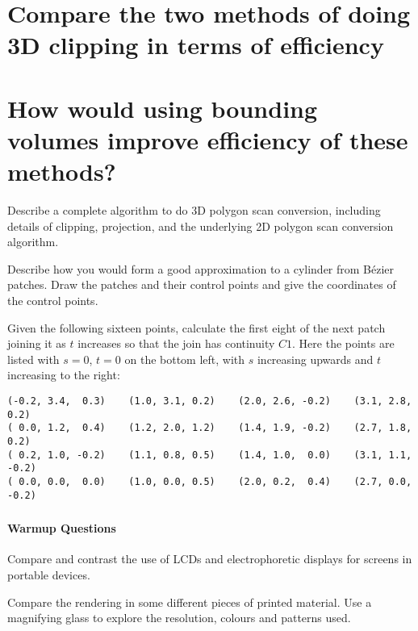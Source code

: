 \documentclass{supervision}
\begin{document}
\begin{questions}
    \question
    \begin{parts}
        \part{Compare the two methods of doing 3D clipping in terms of efficiency}
        \part{How would using bounding volumes improve efficiency of these methods?}
    \end{parts}

    \question
    Describe a complete algorithm to do 3D polygon scan conversion, including details of clipping, projection, and the underlying 2D polygon scan conversion algorithm.

    \question
    Describe how you would form a good approximation to a cylinder from Bézier patches. Draw the patches and their control points and give the coordinates of the control points.

    \question
    Given the following sixteen points, calculate the first eight of the next patch joining it as $t$ increases so that the join has continuity $C1$. Here the points are listed with $s=0$, $t=0$ on the bottom left, with $s$ increasing upwards and $t$ increasing to the right:
    \begin{Verbatim}[fontsize=\scriptsize]
(-0.2, 3.4,  0.3)    (1.0, 3.1, 0.2)    (2.0, 2.6, -0.2)    (3.1, 2.8,  0.2)
( 0.0, 1.2,  0.4)    (1.2, 2.0, 1.2)    (1.4, 1.9, -0.2)    (2.7, 1.8,  0.2)
( 0.2, 1.0, -0.2)    (1.1, 0.8, 0.5)    (1.4, 1.0,  0.0)    (3.1, 1.1, -0.2)
( 0.0, 0.0,  0.0)    (1.0, 0.0, 0.5)    (2.0, 0.2,  0.4)    (2.7, 0.0, -0.2)
    \end{Verbatim}

\end{questions}

\section*{\Topics}
\subsection*{Warmup Questions}
\begin{questions}
    \question
    Compare and contrast the use of LCDs and electrophoretic displays for screens in portable devices.

    \question
    Compare the rendering in some different pieces of printed material. Use a magnifying glass to explore the resolution, colours and patterns used.

\end{questions}
\end{document}
